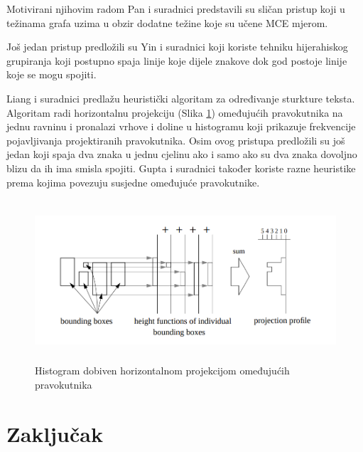 \documentclass[times, utf8, zavrsni]{fer}
\begin{document}
Motivirani njihovim radom Pan i suradnici \citep{pan2011hybrid} predstavili su sličan pristup
koji u težinama grafa uzima u obzir dodatne težine koje su učene MCE  mjerom.

Još jedan pristup predložili su Yin i suradnici \citep{DBLP:journals/corr/abs-1301-2628} koji koriste
tehniku hijerahiskog grupiranja koji postupno spaja linije koje dijele znakove dok god
postoje linije koje se mogu spojiti. \citep{DBLP:journals/corr/TianPHLYT16}

Liang i suradnici \citep{liang1996document} predlažu heuristički algoritam za određivanje sturkture
teksta. Algoritam radi horizontalnu projekciju (Slika \ref{fig:histogram-projection}) omeđujućih pravokutnika na jednu ravninu i pronalazi
vrhove i doline u histogramu koji prikazuje frekvencije pojavljivanja projektiranih pravokutnika.
Osim ovog pristupa predložili su još jedan koji spaja dva znaka u jednu cjelinu ako i samo ako
su dva znaka dovoljno blizu da ih ima smisla spojiti. Gupta i suradnici \citep{gupta2006document} također koriste razne heuristike prema kojima
povezuju susjedne omeđujuće pravokutnike.

\begin{figure}[htb]
    \centering
    \includegraphics[height=6cm]{images/histogram-projection.png}
    \caption{Histogram dobiven horizontalnom projekcijom omeđujućih pravokutnika \citep{liang1996document}}
    \label{fig:histogram-projection}
\end{figure}

\chapter{Zaključak}




\begin{sazetak}

\kljucnerijeci{}
\end{sazetak}

\begin{abstract}

\keywords{}
\end{abstract}
\end{document}
